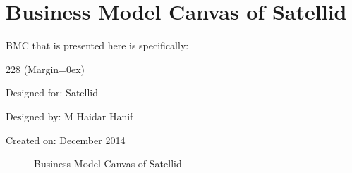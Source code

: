 \section{Business Model Canvas of Satellid}
\label{sec:bmc-satellid}

\ac{BMC} that is presented here is specifically:

\begin{dinglist}{228}
\ListProperties(Margin=0ex)
\item Designed for: Satellid
\item Designed by: M Haidar Hanif
\item Created on: December 2014
\end{dinglist}

\begin{figure}[htbp]
    \centering
    \caption{Business Model Canvas of Satellid}
    \label{fig:bmc:satellid}
\end{figure}
